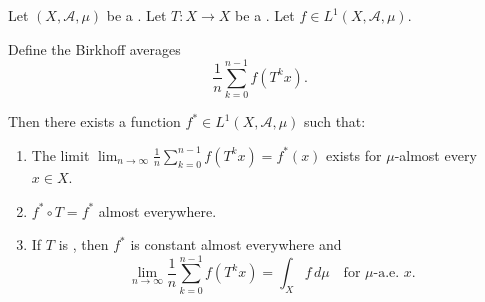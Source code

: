\begin{theorem} \label{theorem:birkhoffs_ergodic_theorem_for_measure_preserving_transformations}
Let $(X, \mathcal{A}, \mu)$ be a . Let $T: X \to X$ be a . Let $f \in L^1(X, \mathcal{A}, \mu)$.

Define the Birkhoff averages
$$\frac{1}{n} \sum_{k=0}^{n-1} f(T^k x).$$

Then there exists a function $f^* \in L^1(X, \mathcal{A}, \mu)$ such that:

\begin{enumerate}
    \item The limit $\lim_{n \to \infty} \tfrac{1}{n} \sum_{k=0}^{n-1} f(T^k x) = f^*(x)$ exists for $\mu$-almost every $x \in X$.
    \item $f^* \circ T = f^*$ almost everywhere.
    \item If $T$ is , then $f^*$ is constant almost everywhere and
    $$\lim_{n \to \infty} \frac{1}{n} \sum_{k=0}^{n-1} f(T^k x) = \int_X f \, d\mu \quad \text{for } \mu\text{-a.e. } x.$$
\end{enumerate}
\end{theorem}
